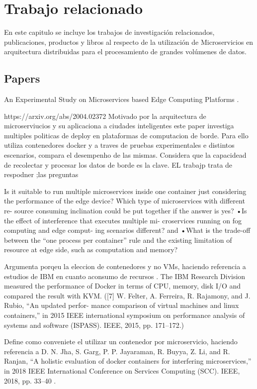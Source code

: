 \chapter{Trabajo relacionado}

En este capitulo se incluye los trabajos de investigación relacionados, publicaciones, productos y libros al respecto de la utilización de Microservicios en arquitectura distribuidas para el procesamiento de grandes volúmenes de datos.


\section{Papers}

 An Experimental Study on Microservices based Edge Computing Platforms \cite{DBLP}.
 
https://arxiv.org/abs/2004.02372
Motivado por la arquitectura de microserviucios y su aplicaciona a  ciudades inteligentes
este paper investiga multiples politicas de deploy en plataformas de computacion de borde.
Para ello utiliza contenedores docker y a traves de pruebas experimentales e distintos escenarios, compara el desempenho de las mismas.
Considera que la capacidead de recolectar y procesar los datos de borde es la clave.
EL trabajp trata de respodner ;las preguntas 

Is it suitable to run multiple microservices inside one
container just considering the performance of the edge
device? Which type of microservices with different re-
source consuming inclination could be put together if the
answer is yes?
•Is the effect of interference that executes multiple mi-
croservices running on fog computing and edge comput-
ing scenarios different? and
•What is the trade-off between the “one process per
container” rule and the existing limitation of resource at
edge side, such as computation and memory? 

Argumenta porqeu la eleccion de contenedores y no VMs, haciendo referencia a estudios de IBM en cuanto aconsumo de recursos .
 The IBM
Research Division measured the performance of Docker in
terms of CPU, memory, disk I/O and compared the result
with KVM. ([7] W. Felter, A. Ferreira, R. Rajamony, and J. Rubio, “An updated perfor-
mance comparison of virtual machines and linux containers,” in 2015
IEEE international symposium on performance analysis of systems and
software (ISPASS). IEEE, 2015, pp. 171–172.)

Define como conveniete el utilizar un contenedor por microservicio, haciendo referencia a D. N. Jha, S. Garg, P. P. Jayaraman, R. Buyya, Z. Li, and R. Ranjan, “A
holistic evaluation of docker containers for interfering microservices,”
in 2018 IEEE International Conference on Services Computing (SCC).
IEEE, 2018, pp. 33–40 .



